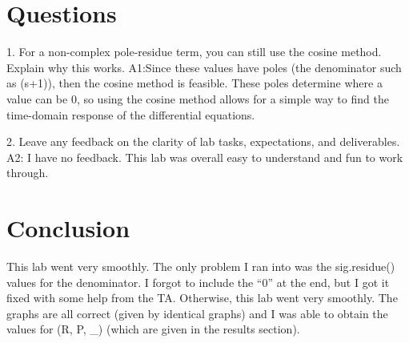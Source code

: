 \documentclass[12pt]{report}
\begin{document}
\section{Questions}

1. For a non-complex pole-residue term, you can still use the cosine method. Explain why this works.
	A1:Since these values have poles (the denominator such as (s+1)), then the cosine method is feasible. These poles determine where a value can be 0, so using the cosine method allows for a simple way to find the time-domain response of the differential equations.
	
2. Leave any feedback on the clarity of lab tasks, expectations, and deliverables.
	A2: I have no feedback. This lab was overall easy to understand and fun to work through.

\section{Conclusion}

This lab went very smoothly. The only problem I ran into was the sig.residue() values for the denominator. I forgot to include the “0” at the end, but I got it fixed with some help from the TA. Otherwise, this lab went very smoothly. The graphs are all correct (given by identical graphs) and I was able to obtain the values for (R, P, _) (which are given in the results section).
\end{document}
